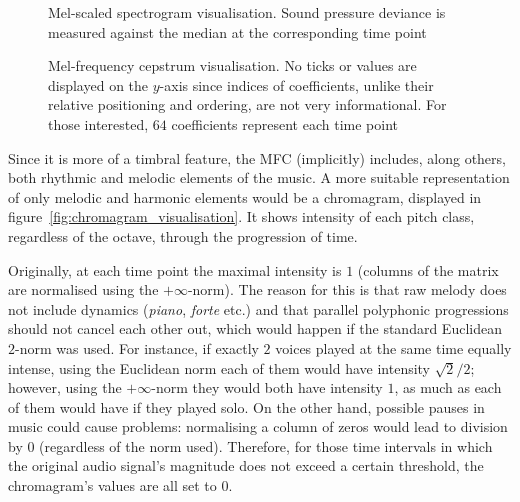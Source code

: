 \documentclass[conference, a4paper, 12pt]{IEEEtran}
\begin{document}
    \par

    \begin{figure}[tbhp!]
        \centering
        
        \caption[Mel-scaled spectrogram visualisation]{Mel-scaled spectrogram visualisation. Sound pressure deviance is measured against the median at the corresponding time point}
        \label{fig:melspectrogram_visualisation}
    \end{figure}

    \par

    \begin{figure}[tbhp!]
        \centering
        
        \caption[Mel-frequency cepstrum visualisation]{Mel-frequency cepstrum visualisation. No ticks or values are displayed on the $ y $-axis since indices of coefficients, unlike their relative positioning and ordering, are not very informational. For those interested, $ 64 $ coefficients represent each time point}
        \label{fig:MFC_visualisation}
    \end{figure}

    \par

    Since it is more of a timbral feature, the MFC (implicitly) includes, along others, both rhythmic and melodic elements of the music. A more suitable representation of only melodic and harmonic elements would be a chromagram, displayed in figure~\ref{fig:chromagram_visualisation}. It shows intensity of each pitch class, regardless of the octave, through the progression of time.

    \par

    Originally, at each time point the maximal intensity is $ 1 $ (columns of the matrix are normalised using the $ {+ \infty} $-norm). The reason for this is that raw melody does not include dynamics (\foreignlanguage{italian}{\emph{piano}}, \foreignlanguage{italian}{\emph{forte}} etc.) and that parallel polyphonic progressions should not cancel each other out, which would happen if the standard Euclidean $ 2 $-norm was used. For instance, if exactly $ 2 $ voices played at the same time equally intense, using the Euclidean norm each of them would have intensity $ \sqrt{2} / 2 $; however, using the $ {+ \infty} $-norm they would both have intensity $ 1 $, as much as each of them would have if they played solo. On the other hand, possible pauses in music could cause problems: normalising a column of zeros would lead to division by $ 0 $ (regardless of the norm used). Therefore, for those time intervals in which the original audio signal's magnitude does not exceed a certain threshold, the chromagram's values are all set to $ 0 $.
\end{document}
